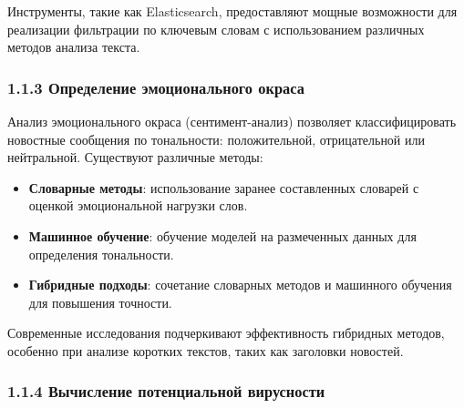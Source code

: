 Инструменты, такие как Elasticsearch, предоставляют мощные возможности
для реализации фильтрации по ключевым словам с использованием различных
методов анализа текста.

\hypertarget{ux43eux43fux440ux435ux434ux435ux43bux435ux43dux438ux435-ux44dux43cux43eux446ux438ux43eux43dux430ux43bux44cux43dux43eux433ux43e-ux43eux43aux440ux430ux441ux430}{%
\subsubsection{\texorpdfstring{\textbf{1.1.3 Определение эмоционального
окраса}}{1.1.3 Определение эмоционального окраса}}\label{ux43eux43fux440ux435ux434ux435ux43bux435ux43dux438ux435-ux44dux43cux43eux446ux438ux43eux43dux430ux43bux44cux43dux43eux433ux43e-ux43eux43aux440ux430ux441ux430}}

Анализ эмоционального окраса (сентимент-анализ) позволяет
классифицировать новостные сообщения по тональности: положительной,
отрицательной или нейтральной. Существуют различные методы:

\begin{itemize}
\tightlist
\item
  \textbf{Словарные методы}: использование заранее составленных словарей
  с оценкой эмоциональной нагрузки слов.\\
\item
  \textbf{Машинное обучение}: обучение моделей на размеченных данных для
  определения тональности.\\
\item
  \textbf{Гибридные подходы}: сочетание словарных методов и машинного
  обучения для повышения точности.
\end{itemize}

Современные исследования подчеркивают эффективность гибридных методов,
особенно при анализе коротких текстов, таких как заголовки новостей.

\hypertarget{ux432ux44bux447ux438ux441ux43bux435ux43dux438ux435-ux43fux43eux442ux435ux43dux446ux438ux430ux43bux44cux43dux43eux439-ux432ux438ux440ux443ux441ux43dux43eux441ux442ux438}{%
\subsubsection{\texorpdfstring{\textbf{1.1.4 Вычисление потенциальной
вирусности}}{1.1.4 Вычисление потенциальной вирусности}}\label{ux432ux44bux447ux438ux441ux43bux435ux43dux438ux435-ux43fux43eux442ux435ux43dux446ux438ux430ux43bux44cux43dux43eux439-ux432ux438ux440ux443ux441ux43dux43eux441ux442ux438}}

